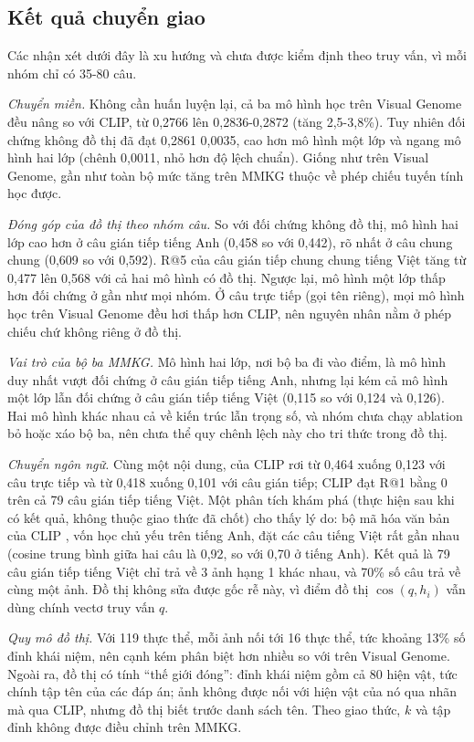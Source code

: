 \subsection{Kết quả chuyển giao}
Các nhận xét dưới đây là xu hướng và chưa được kiểm định theo truy vấn, vì mỗi nhóm chỉ có 35-80 câu.

\textit{Chuyển miền.} Không cần huấn luyện lại, cả ba mô hình học trên Visual Genome đều nâng \mrr{} so với CLIP, từ 0,2766 lên 0,2836-0,2872 (tăng 2,5-3,8\%). Tuy nhiên đối chứng không đồ thị đã đạt 0,2861 \pmm{} 0,0035, cao hơn mô hình một lớp và ngang mô hình hai lớp (chênh 0,0011, nhỏ hơn độ lệch chuẩn). Giống như trên Visual Genome, gần như toàn bộ mức tăng trên MMKG thuộc về phép chiếu tuyến tính học được.

\textit{Đóng góp của đồ thị theo nhóm câu.} So với đối chứng không đồ thị, mô hình hai lớp cao hơn ở câu gián tiếp tiếng Anh (0,458 so với 0,442), rõ nhất ở câu chung chung (0,609 so với 0,592). R@5 của câu gián tiếp chung chung tiếng Việt tăng từ 0,477 lên 0,568 với cả hai mô hình có đồ thị. Ngược lại, mô hình một lớp thấp hơn đối chứng ở gần như mọi nhóm. Ở câu trực tiếp (gọi tên riêng), mọi mô hình học trên Visual Genome đều hơi thấp hơn CLIP, nên nguyên nhân nằm ở phép chiếu chứ không riêng ở đồ thị.

\textit{Vai trò của bộ ba MMKG.} Mô hình hai lớp, nơi bộ ba đi vào điểm, là mô hình duy nhất vượt đối chứng ở câu gián tiếp tiếng Anh, nhưng lại kém cả mô hình một lớp lẫn đối chứng ở câu gián tiếp tiếng Việt (0,115 so với 0,124 và 0,126). Hai mô hình khác nhau cả về kiến trúc lẫn trọng số, và nhóm chưa chạy ablation bỏ hoặc xáo bộ ba, nên chưa thể quy chênh lệch này cho tri thức trong đồ thị.

\textit{Chuyển ngôn ngữ.} Cùng một nội dung, \mrr{} của CLIP rơi từ 0,464 xuống 0,123 với câu trực tiếp và từ 0,418 xuống 0,101 với câu gián tiếp; CLIP đạt R@1 bằng 0 trên cả 79 câu gián tiếp tiếng Việt. Một phân tích khám phá (thực hiện sau khi có kết quả, không thuộc giao thức đã chốt) cho thấy lý do: bộ mã hóa văn bản của CLIP , vốn học chủ yếu trên tiếng Anh, đặt các câu tiếng Việt rất gần nhau (cosine trung bình giữa hai câu là 0,92, so với 0,70 ở tiếng Anh). Kết quả là 79 câu gián tiếp tiếng Việt chỉ trả về 3 ảnh hạng 1 khác nhau, và 70\% số câu trả về cùng một ảnh. Đồ thị không sửa được gốc rễ này, vì điểm đồ thị $\cos(q, h_i)$ vẫn dùng chính vectơ truy vấn $q$.

\textit{Quy mô đồ thị.} Với 119 thực thể, mỗi ảnh nối tới 16 thực thể, tức khoảng 13\% số đỉnh khái niệm, nên cạnh  kém phân biệt hơn nhiều so với trên Visual Genome. Ngoài ra, đồ thị có tính ``thế giới đóng'': đỉnh khái niệm gồm cả 80 hiện vật, tức chính tập tên của các đáp án; ảnh không được nối với hiện vật của nó qua nhãn mà qua CLIP, nhưng đồ thị biết trước danh sách tên. Theo giao thức, $k$ và tập đỉnh không được điều chỉnh trên MMKG.


